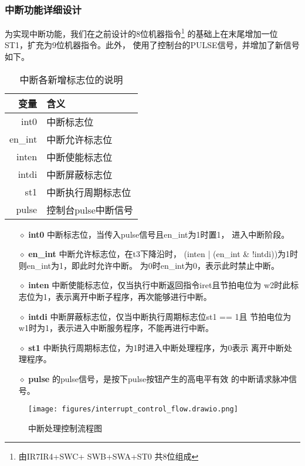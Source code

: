 \subsubsection{中断功能详细设计}
为实现中断功能，我们在之前设计的8位机器指令\footnote{ 由IR7\wave IR4+SWC+
    SWB+SWA+ST0 共8位组成} 的基础上在末尾增加一位ST1，扩充为9位机器指令。此外，
使用了控制台的PULSE信号，并增加了新信号如下。
\begin{table}[h]
    \centering
    \label{interrupt_signal}
    \begin{tabular}[c]{r | l }
        \hline
        变量      & 含义           \\
        \hline
        int0    & 中断标志位        \\
        en\_int & 中断允许标志位      \\ %
        inten   & 中断使能标志位      \\
        intdi   & 中断屏蔽标志位      \\
        st1     & 中断执行周期标志位    \\
        pulse   & 控制台pulse中断信号 \\
        \hline
    \end{tabular}
    \caption{中断各新增标志位的说明}
\end{table}
\begin{itemize}
    \item[$\diamond$ \textbf{int0}] 中断标志位，当传入pulse信号且en\_{}int为1时置1，
        进入中断阶段。
    \item[$\diamond$ \textbf{en\_int}] 中断允许标志位，在t3下降沿时，
        (inten | (en\_int \& !intdi))为1时则en\_int为1，即此时允许中断。
        为0时en\_int为0，表示此时禁止中断。
    \item[$\diamond$ \textbf{inten}] 中断使能标志位，仅当执行中断返回指令iret且节拍电位为
        w2时此标志位为1，表示离开中断子程序，\tec 再次能够进行中断。
    \item[$\diamond$ \textbf{intdi}] 中断屏蔽标志位，仅当中断执行周期标志位st1 == 1且
        节拍电位为w1时为1，表示进入中断服务程序，\tec 不能再进行中断。
    \item[$\diamond$ \textbf{st1}] 中断执行周期标志位，为1时进入中断处理程序，为0表示
        离开中断处理程序。
    \item[$\diamond$ \textbf{pulse}] \tec 的pulse信号，是按下pulse按钮产生的高电平有效
        的中断请求脉冲信号。
\end{itemize}
\begin{figure}[h]
    \centering
    \label{interrupt_control_flow}
    \texttt{[image: figures/interrupt\_control\_flow.drawio.png]}
    \caption{中断处理控制流程图}
\end{figure}
